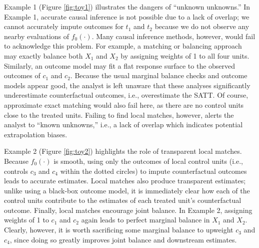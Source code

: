 \documentclass{article}
\begin{document}
Example 1 (Figure \ref{fig:toy1}) illustrates the dangers of ``unknown unknowns.''
In Example 1, accurate causal inference is not possible due to a lack of overlap; we cannot accurately impute outcomes for $t_1$ and $t_2$ because we do not observe any nearby evaluations of $f_0(\cdot)$.
Many causal inference methods, however, would fail to acknowledge this problem.
For example, a matching or balancing approach may exactly balance both $X_1$ and $X_2$ by assigning weights of 1 to all four units.
Similarly, an outcome model may fit a flat response surface to the observed outcomes of $c_1$ and $c_2$.
Because the usual marginal balance checks and outcome models appear good, the analyst is left unaware that these analyses significantly underestimate counterfactual outcomes, i.e., overestimate the SATT.
Of course, approximate exact matching would also fail here, as there are no control units close to the treated units.
Failing to find local matches, however, alerts the analyst to ``known unknowns,'' i.e., a lack of overlap which indicates potential extrapolation biases.

Example 2 (Figure \ref{fig:toy2}) highlights the role of transparent local matches.
Because $f_0(\cdot)$ is smooth, using only the outcomes of local control units (i.e., controls $c_3$ and $c_4$ within the dotted circles) to impute counterfactual outcomes leads to accurate estimates.
Local matches also produce transparent estimates;
unlike using a black-box outcome model, it is immediately clear how each of the control units contribute to the estimates of each treated unit's counterfactual outcome.
Finally, local matches encourage joint balance.
In Example 2, assigning weights of 1 to $c_1$ and $c_2$ again leads to perfect marginal balance in $X_1$ and $X_2$.
Clearly, however, it is worth sacrificing some marginal balance to upweight $c_3$ and $c_4$, since doing so greatly improves joint balance and downstream estimates.

\end{document}

